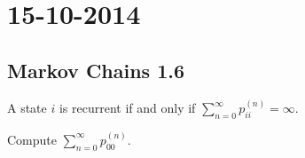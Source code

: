 \section{15-10-2014}
\subsection{Markov Chains 1.6}

\begin{thm}
A state \(i\) is recurrent if and only if \(\sum _{n=0}^\infty p_{ii}^{(n)}=\infty .\)
\end{thm}

\begin{thm}
Compute \(\sum _{n=0}^\infty p_{00}^{(n)}.\)
\end{thm}

